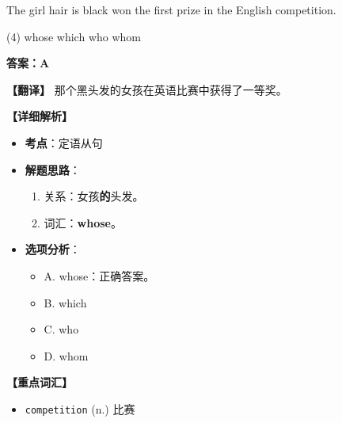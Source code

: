 \documentclass[11pt, a4paper]{article}
\newcommand{\analysis}[4]{
    \begin{solutionbox}
        \textbf{答案：#1}
        
        \textbf{【翻译】} #2
        
        \textbf{【详细解析】}
        #3
        
        \textbf{【重点词汇】}
        #4
    \end{solutionbox}
}
\newcommand{\blank}{\underline{\hspace{1.5cm}}}
\begin{document}
\begin{questions}
    \item The girl \blank hair is black won the first prize in the English competition.
    \begin{tasks}(4)
        \task whose \task which \task who \task whom
    \end{tasks}
    \analysis{A}{那个黑头发的女孩在英语比赛中获得了一等奖。}{
        \begin{itemize}
            \item \textbf{考点}：定语从句
            \item \textbf{解题思路}：
                \begin{enumerate}
                    \item 关系：女孩\textbf{的}头发。
                    \item 词汇：\textbf{whose}。
                \end{enumerate}
            \item \textbf{选项分析}：
                \begin{itemize}
                    \item A. whose：正确答案。
                    \item B. which
                    \item C. who
                    \item D. whom
                \end{itemize}
        \end{itemize}
    }{
        \begin{itemize}
            \item \texttt{competition} (n.) 比赛
        \end{itemize}
    }


\end{questions}
\end{document}
